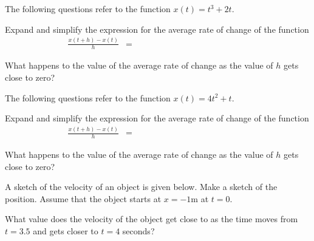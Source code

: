 \begin{problem}
  \item The following questions refer to the function $x(t)=t^3+2t$.
    \begin{subproblem}
    \item Expand and simplify the expression for the average rate of
      change of the function
      \begin{eqnarray*}
        \frac{x(t+h)-x(t)}{h} & = & ~~~~~~~~~~~~~~~~~~~~~~~~~~~~~~~~~~~~~~~~~~~~~~~~~~~~~~~~~~
      \end{eqnarray*}
      \vspace{3em}
    \item What happens to the value of the average rate of change as
      the value of $h$ gets close to zero?
      \vspace{3em}
    \end{subproblem}

    \clearpage

  \item The following questions refer to the function $x(t)=4t^2+t$.
    \begin{subproblem}
    \item Expand and simplify the expression for the average rate of
      change of the function
      \begin{eqnarray*}
        \frac{x(t+h)-x(t)}{h} & = & ~~~~~~~~~~~~~~~~~~~~~~~~~~~~~~~~~~~~~~~~~~~~~~~~~~~~~~~~~~
      \end{eqnarray*}
      \vspace{3em}
    \item What happens to the value of the average rate of change as
      the value of $h$ gets close to zero?
      \vspace{3em}
    \end{subproblem}

    \clearpage

  \item A sketch of the velocity of an object is given below. Make a
    sketch of the position. Assume that the object starts at $x=-1$m
    at $t=0$.

    \scalebox{0.8}{}

    \begin{subproblem}
    \item What value does the velocity of the object get close to as
      the time moves from $t=3.5$ and gets closer to $t=4$ seconds?
    \end{subproblem}

\end{problem}

